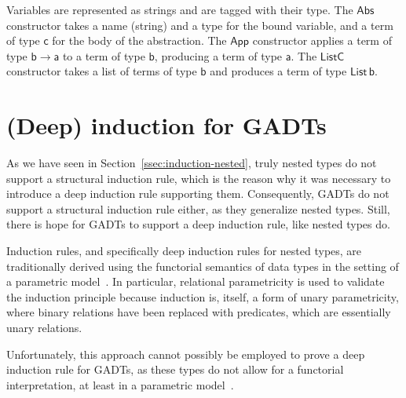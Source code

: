 \documentclass[acmsmall,screen,review,anonymous]{acmart}
\theoremstyle{definition}
\begin{document}
Variables are represented as strings and are tagged with their type. 
The $\mathsf{Abs}$ constructor takes a name (string) and a type for the bound variable,
and a term of type $\mathsf{c}$ for the body of the abstraction.
The $\mathsf{App}$ constructor applies a term of type $\mathsf{b \to a}$ to a term of type $\mathsf{b}$, producing
a term of type $\mathsf{a}$. 
The $\mathsf{ListC}$ constructor takes a list of terms of type $\mathsf{b}$ and produces a term of type $\mathsf{List\,b}$.


\section{(Deep) induction for GADTs}


As we have seen in Section~\ref{ssec:induction-nested},
truly nested types do not support a structural induction rule,
which is the reason why it was necessary to introduce a deep induction rule supporting them.
Consequently, GADTs do not support a structural induction rule either,
as they generalize nested types.
Still, there is hope for GADTs to support a deep induction rule,
like nested types do.

Induction rules, and specifically deep induction rules for nested types,
are traditionally derived using the functorial semantics of data types
in the setting of a parametric model~\cite{jp19}.
In particular, relational parametricity is used to validate the induction principle because induction is, itself,
a form of unary parametricity, where binary relations have been replaced with predicates,
which are essentially unary relations.

Unfortunately, this approach cannot possibly be employed
to prove a deep induction rule for GADTs,
as these types do not allow for a functorial interpretation,
at least in a parametric model~\cite{Haskell-paper}.
\end{document}
